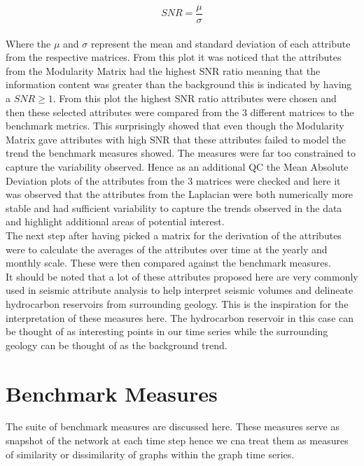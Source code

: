 \begin{equation}
      SNR = \frac{\mu}{\sigma}
\end{equation}
\\
Where the $\mu$ and $\sigma$ represent the mean and standard deviation of each attribute from the respective matrices. From this plot it was noticed that the attributes from the Modularity Matrix had the highest SNR ratio meaning that the information content was greater than the background this is indicated by having a $SNR \geq 1$. From this plot the highest SNR ratio attributes were chosen and then these selected attributes were compared from the 3 different matrices to the benchmark metrics. This surprisingly showed that even though the Modularity Matrix gave attributes with high SNR that these attributes failed to model the trend the benchmark measures showed. The measures were far too constrained to capture the variability observed. Hence as an additional QC the Mean Absolute Deviation plots of the attributes from the 3 matrices were  checked and here it was observed that the attributes from the Laplacian were both numerically more stable and had sufficient variability to capture the trends observed in the data and highlight additional areas of potential interest. \\

The next step after having picked a matrix for the derivation of the attributes were to calculate the averages of the attributes over time at the yearly and monthly scale. These were then compared against the benchmark measures. \\

It should be noted that a lot of these attributes proposed here are very commonly used in seismic attribute analysis to help interpret seismic volumes and delineate hydrocarbon reservoirs from surrounding geology. This is the inspiration for the interpretation of these measures here. The hydrocarbon reservoir in this case can be thought of as interesting points in our time series while the surrounding geology can be thought of as the background trend. \\

\section{Benchmark Measures}

The suite of benchmark measures are discussed here. These measures serve as snapshot of the network at each time step hence we cna treat them as measures of similarity or dissimilarity of graphs within the graph time series. \\

